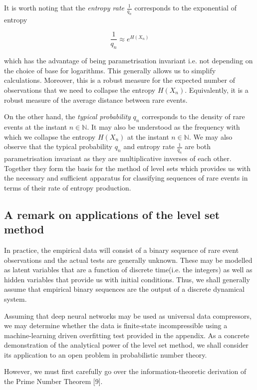 \documentclass{article}
\begin{document}
It is worth noting that the \textit{entropy rate} $\frac{1}{q_n}$ corresponds 
to the exponential of entropy

\begin{equation}
\frac{1}{q_n} \approx e^{H(X_n)}	
\end{equation}

which has the advantage of being 
parametrisation invariant i.e. not depending on the choice of base for logarithms. This generally allows us to simplify calculations. Moreover, this is a robust measure for the expected number of observations that we need to collapse the entropy $H(X_n)$. Equivalently, it is a robust measure of the average distance between rare events. 

On the other hand, the \textit{typical probability} $q_n$ corresponds to the 
density of rare events at the instant $n \in \mathbb{N}$. It may also be understood as the frequency with which we collapse the entropy $H(X_n)$ at the instant $n \in \mathbb{N}$. We may also observe that the typical probability $q_n$ and entropy rate $\frac{1}{q_n}$ are both parametrisation invariant as they are multiplicative inverses of each other.
Together they form the basis for the method of level sets which provides us with 
the necessary and sufficient apparatus for classifying sequences of rare events 
in terms of their rate of entropy production.  

\subsection{A remark on applications of the level set method}

In practice, the empirical data will consist of a binary sequence of rare event 
observations and the actual tests are generally unknown. These may be modelled 
as latent variables that are a function of discrete time(i.e. the integers) as 
well as hidden variables that provide us with initial conditions. Thus, we shall 
generally assume that empirical binary sequences are the output of a discrete dynamical system.

Assuming that deep neural networks may be used as universal data compressors, we may determine whether the data is finite-state incompressible using a machine-learning driven overfitting test provided in the appendix. As a concrete demonstration of the analytical power of the level set method, we shall consider its application to an open problem in probabilistic number theory. 

However, we must first carefully go over the information-theoretic derivation of the Prime Number Theorem [9]. 
\end{document}
